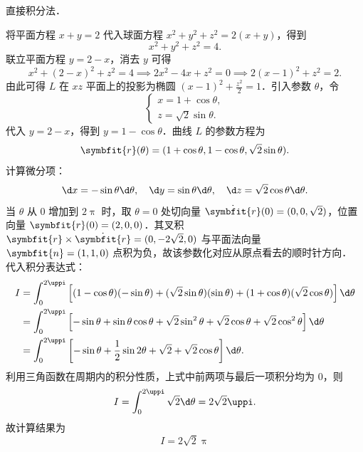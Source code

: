 \begin{solution}
    直接积分法．

    将平面方程 $x + y = 2$ 代入球面方程 $x^2 + y^2 + z^2 = 2(x + y)$，得到
    \begin{equation}
        x^2 + y^2 + z^2 = 4.
    \end{equation}
    联立平面方程 $y = 2 - x$，消去 $y$ 可得
    \begin{equation}
        x^2 + (2 - x)^2 + z^2 = 4 \implies 2x^2 - 4x + z^2 = 0 \implies 2(x - 1)^2 + z^2 = 2.
    \end{equation}
    由此可得 $L$ 在 $xz$ 平面上的投影为椭圆 $(x-1)^2 + \frac{z^2}{2} = 1$．引入参数 $\theta$，令
    \begin{equation}
        \begin{cases}
            x = 1 + \cos \theta, \\
            z = \sqrt{2} \sin \theta.
        \end{cases}
    \end{equation}
    代入 $y = 2 - x$，得到 $y = 1 - \cos \theta$．曲线 $L$ 的参数方程为
    \begin{equation}
        \symbfit{r}(\theta) = (1 + \cos \theta, 1 - \cos \theta, \sqrt{2} \sin \theta).
    \end{equation}
    计算微分项：
    \begin{equation}
        \d x = -\sin \theta \d \theta, \quad \d y = \sin \theta \d \theta, \quad \d z = \sqrt{2} \cos \theta \d \theta.
    \end{equation}
    当 $\theta$ 从 $0$ 增加到 $2\uppi$ 时，取 $\theta = 0$ 处切向量 $\dot{\symbfit{r}}(0) = (0, 0, \sqrt{2})$，位置向量 $\symbfit{r}(0) = (2, 0, 0)$．其叉积 $\symbfit{r} \times \dot{\symbfit{r}} = (0, -2\sqrt{2}, 0)$ 与平面法向量 $\symbfit{n} = (1, 1, 0)$ 点积为负，故该参数化对应从原点看去的顺时针方向．
    代入积分表达式：
    \begin{equation}
        \begin{aligned}
            I & = \int_0^{2\uppi} \left[ (1 - \cos \theta)(-\sin \theta) + (\sqrt{2} \sin \theta)(\sin \theta) + (1 + \cos \theta)(\sqrt{2} \cos \theta) \right] \d \theta \\
              & = \int_0^{2\uppi} \left[ -\sin \theta + \sin \theta \cos \theta + \sqrt{2} \sin^2 \theta + \sqrt{2} \cos \theta + \sqrt{2} \cos^2 \theta \right] \d \theta \\
              & = \int_0^{2\uppi} \left[ -\sin \theta + \frac{1}{2} \sin 2\theta + \sqrt{2} + \sqrt{2} \cos \theta \right] \d \theta.
        \end{aligned}
    \end{equation}
    利用三角函数在周期内的积分性质，上式中前两项与最后一项积分均为 $0$，则
    \begin{equation}
        I = \int_0^{2\uppi} \sqrt{2} \d \theta = 2\sqrt{2}\uppi.
    \end{equation}
    故计算结果为
    \begin{equation}
        I = \boxed{2\sqrt{2}\uppi}
    \end{equation}
\end{solution}

